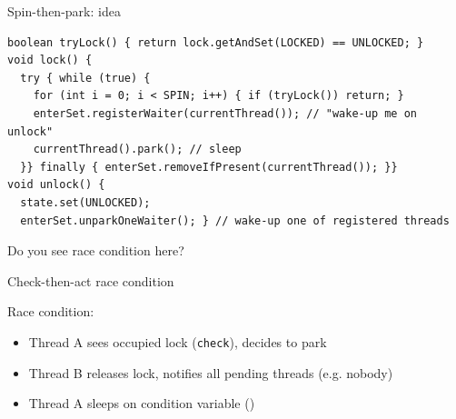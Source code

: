 \begin{frame}[fragile]{Spin-then-park: idea}

\begin{verbatim}
boolean tryLock() { return lock.getAndSet(LOCKED) == UNLOCKED; }
void lock() {
  try { while (true) { 
    for (int i = 0; i < SPIN; i++) { if (tryLock()) return; }    
    enterSet.registerWaiter(currentThread()); // "wake-up me on unlock"
    currentThread().park(); // sleep 
  }} finally { enterSet.removeIfPresent(currentThread()); }}
void unlock() { 
  state.set(UNLOCKED); 
  enterSet.unparkOneWaiter(); } // wake-up one of registered threads
\end{verbatim}

\pause 
Do you see race condition here?

\end{frame}


\begin{frame}{Check-then-act race condition}

Race condition: 
\begin{itemize}
 \item Thread A sees occupied lock (\texttt{check}), decides to park
 \item Thread B releases lock, notifies all pending threads (e.g. nobody)
 \item Thread A sleeps on condition variable ()
\end{itemize}

\end{frame}


